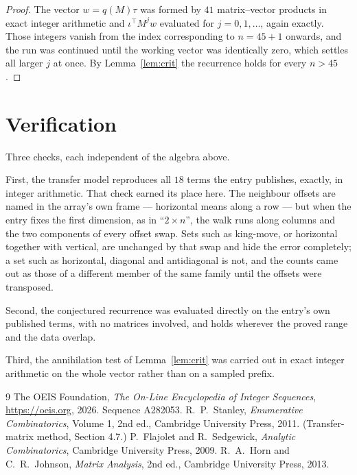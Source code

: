 \documentclass[11pt,a4paper]{article}
\theoremstyle{plain}
\theoremstyle{definition}
\begin{document}
\begin{proof}
The vector $w=q(M)\tau$ was formed by $41$ matrix--vector products in exact integer
arithmetic and $\iota^{\!\top}M^{j}w$ evaluated for $j=0,1,\dots$, again exactly. Those
integers vanish from the index corresponding to $n=45+1$ onwards, and the run was
continued until the working vector was identically zero, which settles all larger $j$ at once.
By Lemma~\ref{lem:crit} the recurrence holds for every $n>45$.
\end{proof}

\section{Verification}

Three checks, each independent of the algebra above.

First, the transfer model reproduces all $18$ terms the entry publishes, exactly, in
integer arithmetic. That check earned its place here. The neighbour offsets are named in the
array's own frame --- horizontal means along a row --- but when the entry fixes the first
dimension, as in ``$2\times n$'', the walk runs along columns and the two components of every
offset swap. Sets such as king-move, or horizontal together with vertical, are unchanged by
that swap and hide the error completely; a set such as horizontal, diagonal and antidiagonal
is not, and the counts came out as those of a different member of the same family until the
offsets were transposed.

Second, the conjectured recurrence was evaluated directly on the entry's own published terms,
with no matrices involved, and holds wherever the proved range and the data overlap.

Third, the annihilation test of Lemma~\ref{lem:crit} was carried out in exact integer
arithmetic on the whole vector rather than on a sampled prefix.

\begin{thebibliography}{9}
 The OEIS Foundation, \emph{The On-Line Encyclopedia of Integer
Sequences}, \url{https://oeis.org}, 2026. Sequence A282053.
 R.~P.~Stanley, \emph{Enumerative Combinatorics}, Volume 1, 2nd ed.,
Cambridge University Press, 2011. (Transfer-matrix method, Section 4.7.)
 P.~Flajolet and R.~Sedgewick, \emph{Analytic Combinatorics}, Cambridge
University Press, 2009.
 R.~A.~Horn and C.~R.~Johnson, \emph{Matrix Analysis}, 2nd ed., Cambridge
University Press, 2013.
\end{thebibliography}
\end{document}
